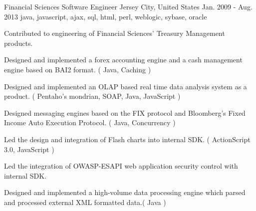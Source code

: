 \cventry
    {Financial Sciences} %
    {Software Engineer} %
    {Jersey City, United States} %
    {Jan. 2009 - Aug. 2013} %
    {java, javascript, ajax, sql, html, perl, weblogic, sybase, oracle} %
    {
        Contributed to engineering of Financial Sciences' Treasury Management products.
    \begin{cvitems} %
        \item { Designed and implemented a forex accounting engine and a cash management engine based on BAI2 format. ( Java, Caching )}
        \item { Designed and implemented an OLAP based real time data analysis system as a product. ( Pentaho's mondrian, SOAP, Java, JavaScript )}
        \item { Designed messaging engines based on the FIX protocol and Bloomberg's Fixed Income Auto Execution Protocol. ( Java, Concurrency )}
        \item { Led the design and integration of Flash charts into internal SDK. ( ActionScript 3.0, JavaScript )}
        \item { Led the integration of OWASP-ESAPI web application security control with internal SDK.}
        \item { Designed and implemented a high-volume data processing engine which parsed and processed external XML formatted data.( Java )}
    \end{cvitems}
    }
    